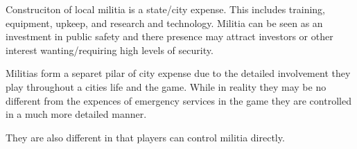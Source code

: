 
Construciton of local militia is a state/city expense. This includes training, equipment, upkeep, and research and technology. Militia can be seen as an investment in public safety and there presence may attract investors or other interest wanting/requiring high levels of security.

Militias form a separet pilar of city expense due to the detailed involvement they play throughout a cities life and the game. While in reality they may be no different from the expences of emergency services in the game they are controlled in a much more detailed manner.

They are also different in that players can control militia directly.
